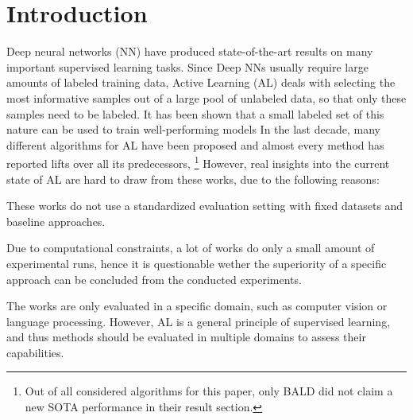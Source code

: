 \documentclass[]{article}
\begin{document}
\section{Introduction}
Deep neural networks (NN) have produced state-of-the-art results on many
important supervised learning tasks. Since Deep NNs usually require large
amounts of labeled training data, Active Learning (AL) deals with
selecting the most informative samples out of a large pool of unlabeled data, so
that only these samples need to be labeled. It has been shown that a small
labeled set of this nature can be used to train well-performing models
In the last decade, many different algorithms for AL have been proposed and
almost every method has reported lifts over all its predecessors, \footnote{Out
of all considered algorithms for this paper, only BALD \cite{gal2017deep} did
not claim a new SOTA performance in their result section.} However, real
insights into the current state of AL are hard to draw from these works, due to
the following reasons:
\begin{inparaenum}
\item\label{prob1al} These works do not use a standardized evaluation setting with fixed
datasets and baseline approaches.
\item Due to computational constraints, a lot of works do only a small amount of experimental
runs, hence it is questionable wether the superiority of a specific approach can
be concluded from the conducted experiments.
\item The works are only evaluated in a specific domain, such as computer vision
or language processing. However, AL is a general principle of supervised
learning, and thus methods should be evaluated in multiple domains to assess
their capabilities.
\end{inparaenum}
\end{document}
